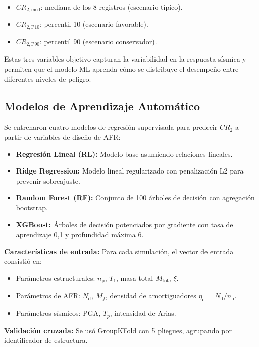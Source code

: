 \documentclass[preprint,12pt,authoryear]{elsarticle}
\newcommand{\CR}[1]{CR_{2,\text{#1}}}
\newcommand{\nd}{N_{\mathrm{d}}}
\newcommand{\np}{n_{\mathrm{p}}}
\newcommand{\etad}{\eta_{\mathrm{d}}}
\newcommand{\Mf}{M_{\!f}}
\begin{document}
\begin{itemize}[leftmargin=1.5em]
  \item $\CR{med}$: mediana de los 8 registros (escenario típico).
  \item $\CR{P10}$: percentil 10 (escenario favorable).
  \item $\CR{P90}$: percentil 90 (escenario conservador).
\end{itemize}

Estas tres variables objetivo capturan la variabilidad en la respuesta sísmica y permiten que 
el modelo ML aprenda cómo se distribuye el desempeño entre diferentes niveles de peligro.

\subsection{Modelos de Aprendizaje Automático}
\label{sec:ml_models}

Se entrenaron cuatro modelos de regresión supervisada para predecir $CR_2$ a partir de 
variables de diseño de AFR:

\begin{itemize}[leftmargin=1.5em]
  \item \textbf{Regresión Lineal (RL):} Modelo base asumiendo relaciones lineales.
  \item \textbf{Ridge Regression:} Modelo lineal regularizado con penalización L2 para 
        prevenir sobreajuste.
  \item \textbf{Random Forest (RF):} Conjunto de 100 árboles de decisión con agregación bootstrap.
  \item \textbf{XGBoost:} Árboles de decisión potenciados por gradiente con tasa de aprendizaje 
        0,1 y profundidad máxima 6.
\end{itemize}

\textbf{Características de entrada:} Para cada simulación, el vector de entrada consistió en:
\begin{itemize}[leftmargin=1.5em]
  \item Parámetros estructurales: $\np$, $T_1$, masa total $M_{\text{tot}}$, $\xi$.
  \item Parámetros de AFR: $\nd$, $\Mf$, densidad de amortiguadores $\etad = \nd/\np$.
  \item Parámetros sísmicos: PGA, $T_p$, intensidad de Arias.
\end{itemize}

\textbf{Validación cruzada:} Se usó GroupKFold con 5 pliegues, agrupando por identificador
de estructura.
\end{document}
